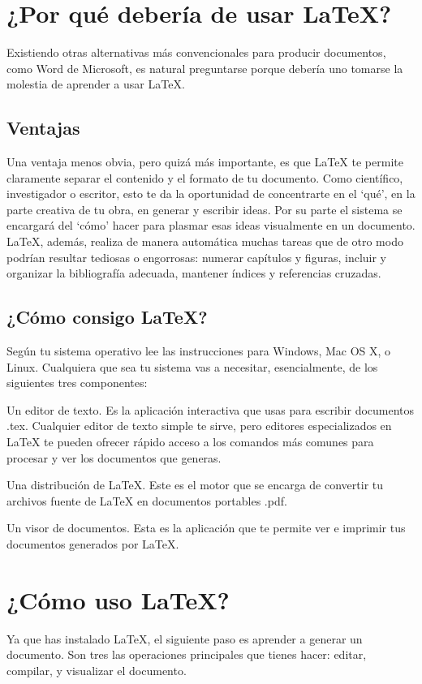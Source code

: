 \documentclass{article}
\begin{document}
\begin{multicols}{2} %
\section{¿Por qué debería de usar LaTeX?}
Existiendo otras alternativas más convencionales para producir documentos, como Word de Microsoft, es natural preguntarse porque debería uno tomarse la molestia de aprender a usar LaTeX.

\subsection{Ventajas}
Una ventaja menos obvia, pero quizá más importante, es que LaTeX te permite claramente separar el contenido y el formato de tu documento. Como científico, investigador o escritor, esto te da la oportunidad de concentrarte en el ‘qué’, en la parte creativa de tu obra, en generar y escribir ideas. Por su parte el sistema se encargará del ‘cómo’ hacer para plasmar esas ideas visualmente en un documento. LaTeX, además, realiza de manera automática muchas tareas que de otro modo podrían resultar tediosas o engorrosas: numerar capítulos y figuras, incluir y organizar la bibliografía adecuada, mantener índices y referencias cruzadas.

\subsection{¿Cómo consigo LaTeX?}
Según tu sistema operativo lee las instrucciones para Windows, Mac OS X, o Linux. Cualquiera que sea tu sistema vas a necesitar, esencialmente, de los siguientes tres componentes:

Un editor de texto. Es la aplicación interactiva que usas para escribir documentos .tex. Cualquier editor de texto simple te sirve, pero editores especializados en LaTeX te pueden ofrecer rápido acceso a los comandos más comunes para procesar y ver los documentos que generas.

Una distribución de LaTeX. Este es el motor que se encarga de convertir tu archivos fuente de LaTeX en documentos portables .pdf.

Un visor de documentos. Esta es la aplicación que te permite ver e imprimir tus documentos generados por LaTeX.

\section{¿Cómo uso LaTeX?}
Ya que has instalado LaTeX, el siguiente paso es aprender a generar un documento. Son tres las operaciones principales que tienes hacer: editar, compilar, y visualizar el documento.


\end{multicols}
\end{document}
